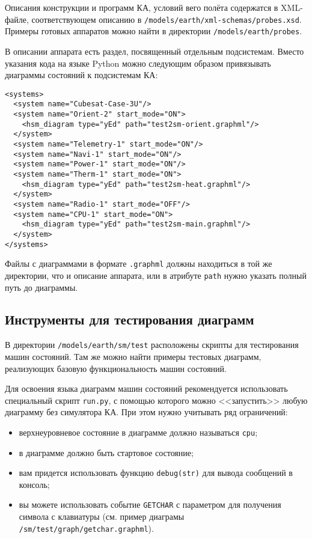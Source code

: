 \documentclass[12pt,a4paper]{article}
\begin{document}
Описания конструкции и программ КА, условий вего полёта содержатся в XML-файле,
соответствующем описанию в \verb'/models/earth/xml-schemas/probes.xsd'. Примеры готовых
аппаратов можно найти в директории \verb'/models/earth/probes'.

В описании аппарата есть раздел, посвященный отдельным подсистемам. Вместо указания кода
на языке Python можно следующим образом привязывать диаграммы состояний к подсистемам КА:

\begin{verbatim}
<systems>
  <system name="Cubesat-Case-3U"/>
  <system name="Orient-2" start_mode="ON">
    <hsm_diagram type="yEd" path="test2sm-orient.graphml"/>
  </system>
  <system name="Telemetry-1" start_mode="ON"/>
  <system name="Navi-1" start_mode="ON"/>
  <system name="Power-1" start_mode="ON"/>
  <system name="Therm-1" start_mode="ON">
    <hsm_diagram type="yEd" path="test2sm-heat.graphml"/>
  </system>
  <system name="Radio-1" start_mode="OFF"/>
  <system name="CPU-1" start_mode="ON">
    <hsm_diagram type="yEd" path="test2sm-main.graphml"/>
  </system>
</systems>
\end{verbatim}

Файлы с диаграммами в формате \verb'.graphml' должны находиться в той же директории, что и
описание аппарата, или в атрибуте \verb'path' нужно указать полный путь до диаграммы.

\subsection*{Инструменты для тестирования диаграмм}

В директории \verb'/models/earth/sm/test' расположены скрипты для тестирования машин
состояний. Там же можно найти примеры тестовых диаграмм, реализующих базовую
функциональность машин состояний.

Для освоения языка диаграмм машин состояний рекомендуется использовать
специальный скрипт \verb'run.py', с помощью которого можно <<запустить>> любую диаграмму
без симулятора КА. При этом нужно учитывать ряд ограничений:

\begin{itemize}
\item верхнеуровневое состояние в диаграмме должно называться \verb'cpu';
\item в диаграмме должно быть стартовое состояние;
\item вам придется использовать функцию \verb'debug(str)' для вывода сообщений в консоль;
\item вы можете использовать событие \verb'GETCHAR' с параметром для получения символа с
  клавиатуры (см. пример диаграмы \verb'/sm/test/graph/getchar.graphml').
\end{itemize}
\end{document}
